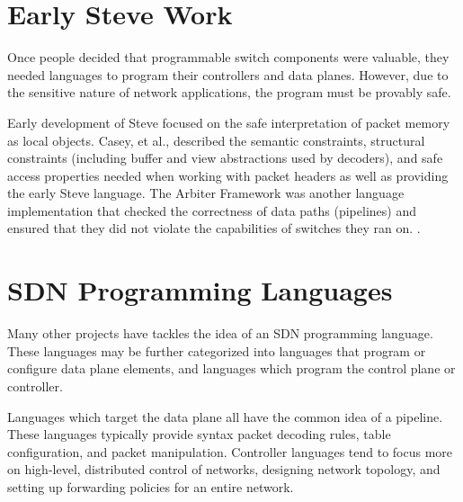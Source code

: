 

\section{Early Steve Work}

Once people decided that programmable switch components were valuable,
they needed languages to program their controllers and data planes.
However, due to the sensitive nature of network applications, the program must be provably safe.

Early development of Steve focused on the safe interpretation of packet memory as local objects.
Casey, et al., described the semantic constraints,
structural constraints (including buffer and view abstractions used by decoders), and 
safe access properties needed when working with packet headers as well as providing the early Steve language.
The Arbiter Framework was another language implementation that checked the correctness of data paths (pipelines) and ensured that they did not violate the 
capabilities of switches they ran on.
\cite{arbiter}.

\section{SDN Programming Languages}

Many other projects have tackles the idea of an SDN programming language.
These languages may be further categorized into languages that program or configure
data plane elements, and languages which program the control plane or controller.

Languages which target the data plane all have the common idea of a pipeline.
These languages typically provide syntax packet decoding rules, table configuration,
and packet manipulation.
Controller languages tend to focus more on high-level, distributed control
of networks, designing network topology, and setting up forwarding policies
for an entire network.

